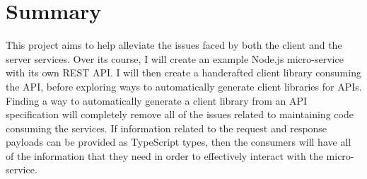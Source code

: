  \section{Summary}
 
 This project aims to help alleviate the issues faced by both the client and the server services. Over its course, I will create an example Node.js micro-service with its own REST API. I will then create a handcrafted client library consuming the API, before exploring ways to automatically generate client libraries for APIs. Finding a way to automatically generate a client library from an API specification will completely remove all of the issues related to maintaining code consuming the services. If information related to the request and response payloads can be provided as TypeScript types, then the consumers will have all of the information that they need in order to effectively interact with the micro-service.
